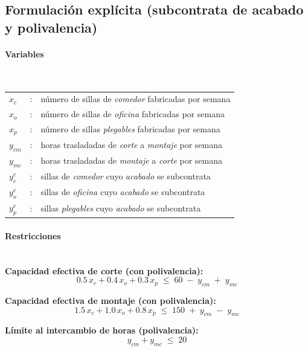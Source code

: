 \subsection{Formulación explícita (subcontrata de acabado y polivalencia)}

\paragraph{Variables}\mbox{}\\
\begin{tabular}{l c l}
    $x_c$  & : & número de sillas de \textit{comedor} fabricadas por semana \\
    $x_o$  & : & número de sillas de \textit{oficina} fabricadas por semana \\
    $x_p$  & : & número de sillas \textit{plegables} fabricadas por semana \\
    $y_{cm}$ & : & horas trasladadas de \textit{corte} a \textit{montaje} por semana \\
    $y_{mc}$ & : & horas trasladadas de \textit{montaje} a \textit{corte} por semana \\
    $y_c^{e}$ & : & sillas de \textit{comedor} cuyo \textit{acabado} se subcontrata \\
    $y_o^{e}$ & : & sillas de \textit{oficina} cuyo \textit{acabado} se subcontrata \\
    $y_p^{e}$ & : & sillas \textit{plegables} cuyo \textit{acabado} se subcontrata \\
\end{tabular}

\paragraph{Restricciones}\mbox{}\\[2pt]
\textbf{Capacidad efectiva de corte (con polivalencia):}
\begin{equation}
    0.5\,x_c + 0.4\,x_o + 0.3\,x_p \;\leq\; 60 \;-\; y_{cm} \;+\; y_{mc}
\end{equation}

\textbf{Capacidad efectiva de montaje (con polivalencia):}
\begin{equation}
    1.5\,x_c + 1.0\,x_o + 0.8\,x_p \;\leq\; 150 \;+\; y_{cm} \;-\; y_{mc}
\end{equation}

\textbf{Límite al intercambio de horas (polivalencia):}
\begin{equation}
    y_{cm} + y_{mc} \;\leq\; 20
\end{equation}

